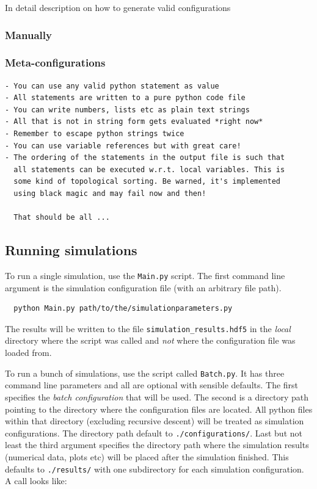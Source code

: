 \documentclass[a4paper,10pt]{report}
\begin{document}
In detail description on how to generate valid configurations

\subsubsection{Manually}

\subsubsection{Meta-configurations}

\begin{verbatim}
- You can use any valid python statement as value
- All statements are written to a pure python code file
- You can write numbers, lists etc as plain text strings
- All that is not in string form gets evaluated *right now*
- Remember to escape python strings twice
- You can use variable references but with great care!
- The ordering of the statements in the output file is such that
  all statements can be executed w.r.t. local variables. This is
  some kind of topological sorting. Be warned, it's implemented
  using black magic and may fail now and then!

  That should be all ...
\end{verbatim}

\subsection{Running simulations}

To run a single simulation, use the \texttt{Main.py} script. The first command
line argument is the simulation configuration file (with an arbitrary file path).

\begin{verbatim}
  python Main.py path/to/the/simulationparameters.py
\end{verbatim}

The results will be written to the file \texttt{simulation\_results.hdf5}
in the \emph{local} directory where the script was called and \emph{not}
where the configuration file was loaded from.

To run a bunch of simulations, use the script called \texttt{Batch.py}. It
has three command line parameters and all are optional with sensible defaults.
The first specifies the \emph{batch configuration} that will be used. The second
is a directory path pointing to the directory where the configuration files
are located. All python files within that directory (excluding recursive descent)
will be treated as simulation configurations. The directory path default to
\texttt{./configurations/}. Last but not least the third argument specifies the
directory path where the simulation results (numerical data, plots etc) will be
placed after the simulation finished. This defaults to \texttt{./results/}
with one subdirectory for each simulation configuration. A call looks like:
\end{document}
